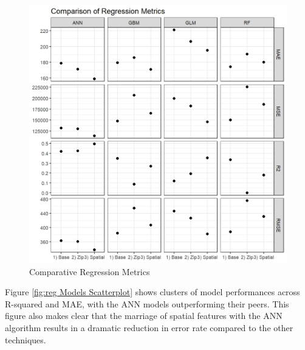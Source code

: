 \documentclass[conference,final,]{IEEEtran}
\makeatletter
\def\maxwidth{\ifdim\Gin@nat@width>\linewidth\linewidth
\else\Gin@nat@width\fi}
\let\Oldincludegraphics\includegraphics
\renewcommand{\includegraphics}[1]{\Oldincludegraphics[width=\maxwidth]{#1}}
\makeatother
\begin{document}
\begin{figure}
\centering
\includegraphics{Sections/tables_and_figures/compare_reg_model_rmse.jpeg}
\caption{\label{fig:Model RMSE Comparrison}Comparative Regression
Metrics}
\end{figure}

\noindent Figure \ref{fig:reg Models Scatterplot} shows clusters of
model performances across R-squared and MAE, with the ANN models
outperforming their peers. This figure also makes clear that the
marriage of spatial features with the ANN algorithm results in a
dramatic reduction in error rate compared to the other techniques.
\end{document}
